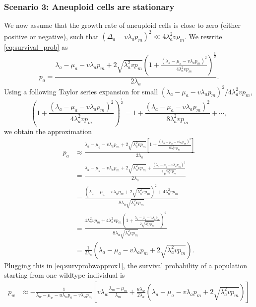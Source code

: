 \documentclass[12pt]{extarticle}
\begin{document}
\begin{appendices}
\subsubsection*{Scenario 3: Aneuploid cells are stationary} 
We now assume that the growth rate of aneuploid cells is close to zero (either positive or negative), such that  $\left(\Delta_a-v\lambda_ap_m\right)^2 \ll 4\lambda_a^2vp_m$.
We rewrite \cref{eq:survival_prob} as
\begin{equation}
p_a = \frac{\lambda_a-\mu_a-v\lambda_ap_m+2\sqrt{\lambda_a^2 vp_m}\left(1+\frac{\left(\lambda_a-\mu_a-v\lambda_ap_m\right)^2}{4\lambda_a^2vp_m}\right)^{\frac12}}{2\lambda_a} .
\end{equation}
Using a following Taylor series expansion for small $\left(\lambda_a-\mu_a-v\lambda_ap_m\right)^2 / 4\lambda_a^2vp_m$,
\begin{equation*}
\left(1+\frac{\left(\lambda_a-\mu_a-v\lambda_ap_m\right)^2}{4\lambda_a^2vp_m}\right)^{\frac{1}{2}}=1+\frac{\left(\lambda_a-\mu_a-v\lambda_ap_m\right)^2}{8\lambda_a^2vp_m}+\cdots,
\end{equation*}
we obtain the approximation
\begin{equation}
\begin{aligned}
p_a&\approx\frac{\lambda_a-\mu_a-v\lambda_ap_m+2\sqrt{\lambda_a^2 vp_m}\left[1+\frac{\left(\lambda_a-\mu_a-v\lambda_ap_m\right)^2}{8\lambda_a^2vp_m}\right]}{2\lambda_a}\\
&=\frac{\lambda_a-\mu_a-v\lambda_ap_m+2\sqrt{\lambda_a^2 vp_m}+\frac{\left(\lambda_a-\mu_a-v\lambda_ap_m\right)^2}{4\sqrt{\lambda_a^2vp_m}}}{2\lambda_a}\\
&=\frac{\left(\lambda_a-\mu_a-v\lambda_ap_m+2\sqrt{\lambda_a^2vp_m}\right)^2+4\lambda_a^2vp_m}{8\lambda_a\sqrt{\lambda_a^2vp_m}}\\
&=\frac{4\lambda_a^2vp_m+4\lambda_a^2vp_m\left(1+\frac{\lambda_a-\mu_a-v\lambda_ap_m}{2\sqrt{\lambda_a^2vp_m}}\right)^2}{8\lambda_a\sqrt{\lambda_a^2vp_m}}\\
&=\frac{1}{2\lambda_a}\left(\lambda_a-\mu_a-v\lambda_ap_m+2\sqrt{\lambda_a^2vp_m}\right).
\end{aligned}
\end{equation}
Plugging this in \cref{eq:survprobwapprox1}, the survival probability of a population starting from one wildtype individual is
\begin{equation}\label{eq:scenario3}
\begin{aligned}
p_w&\approx-\frac{1}{\lambda_w-\mu_w-u\lambda_wp_a-v\lambda_wp_m}\left[v\lambda_w\frac{\lambda_m-\mu_m}{\lambda_m}+\frac{u\lambda_w}{2\lambda_a}\left(\lambda_a-\mu_a-v\lambda_ap_m+2\sqrt{\lambda_a^2vp_m}\right)\right]\\

\end{aligned}
\end{equation}
\end{appendices}
\end{document}
